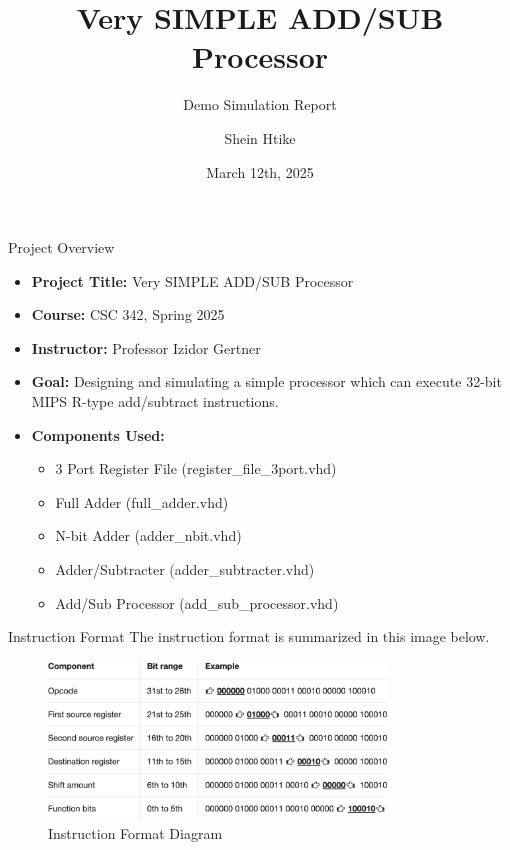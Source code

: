 \documentclass{beamer}
\title{Very SIMPLE ADD/SUB Processor}
\subtitle{Demo Simulation Report}
\author{Shein Htike}
\institute{CSC 342, Spring 2025}
\date{March 12th, 2025}
\begin{document}
\begin{frame}
  \titlepage
\end{frame}

\begin{frame}{Project Overview}
  \begin{itemize}
    \item \textbf{Project Title:} Very SIMPLE ADD/SUB Processor
    \item \textbf{Course:} CSC 342, Spring 2025
    \item \textbf{Instructor:} Professor Izidor Gertner
    \item \textbf{Goal:} Designing and simulating a simple processor which can execute 32-bit MIPS R-type add/subtract instructions.
    \item \textbf{Components Used:}
      \begin{itemize}
      \item 3 Port Register File (register\_file\_3port.vhd)
      \item Full Adder (full\_adder.vhd)
      \item N-bit Adder (adder\_nbit.vhd)
      \item Adder/Subtracter (adder\_subtracter.vhd)
      \item Add/Sub Processor (add\_sub\_processor.vhd)
      \end{itemize}
  \end{itemize}
\end{frame}
\begin{frame}{Instruction Format}
    The instruction format is summarized in this image below.
\begin{figure}[ht]
  \centering
  \includegraphics[width=0.8\textwidth]{./images/instructions.png}
  \caption{Instruction Format Diagram}
\end{figure}
\end{frame}
\end{document}
